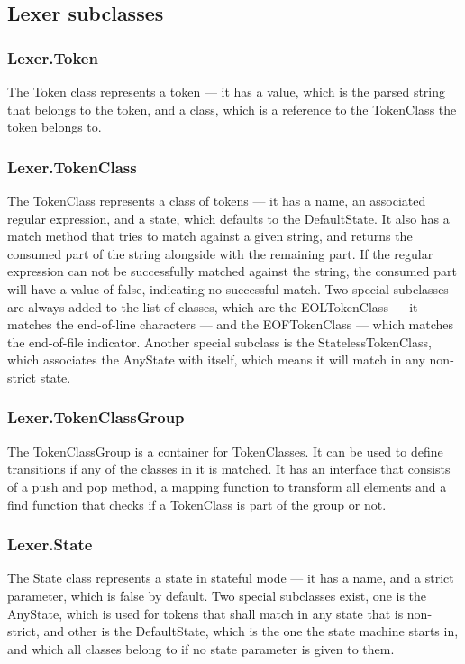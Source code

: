 \subsection{Lexer subclasses}
\subsubsection{Lexer.Token}
The Token class represents a token --- it has a value, which is the parsed string that belongs to the token, and a class, which is a reference to the TokenClass the token belongs to.
\subsubsection{Lexer.TokenClass}
The TokenClass represents a class of tokens --- it has a name, an associated regular expression, and a state, which defaults to the DefaultState. It also has a match method that tries to match against a given string, and returns the consumed part of the string alongside with the remaining part. If the regular expression can not be successfully matched against the string, the consumed part will have a value of false, indicating no successful match.
Two special subclasses are always added to the list of classes, which are the EOLTokenClass --- it matches the end-of-line characters --- and the EOFTokenClass --- which matches the end-of-file indicator.
Another special subclass is the StatelessTokenClass, which associates the AnyState with itself, which means it will match in any non-strict state.
\subsubsection{Lexer.TokenClassGroup}
The TokenClassGroup is a container for TokenClasses. It can be used to define transitions if any of the classes in it is matched. It has an interface that consists of a push and pop method, a mapping function to transform all elements and a find function that checks if a TokenClass is part of the group or not.
\subsubsection{Lexer.State}
The State class represents a state in stateful mode --- it has a name, and a strict parameter, which is false by default.
Two special subclasses exist, one is the AnyState, which is used for tokens that shall match in any state that is non-strict, and other is the DefaultState, which is the one the state machine starts in, and which all classes belong to if no state parameter is given to them.
